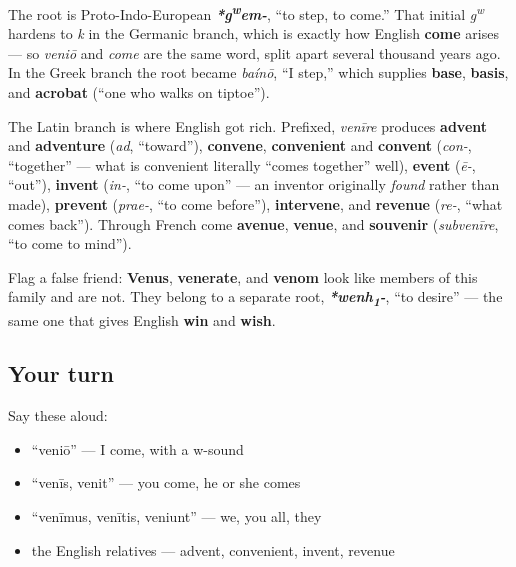 \begin{cousinweb}
The root is Proto-Indo-European \emph{\textbf{*g\textsuperscript{w}em-}}, \textquotedblleft{}to step, to come.\textquotedblright{} That initial \emph{g\textsuperscript{w}} hardens to \emph{k} in the Germanic branch, which is exactly how English \textbf{come} arises — so \emph{veniō} and \emph{come} are the same word, split apart several thousand years ago. In the Greek branch the root became \emph{baínō}, \textquotedblleft{}I step,\textquotedblright{} which supplies \textbf{base}, \textbf{basis}, and \textbf{acrobat} (\textquotedblleft{}one who walks on tiptoe\textquotedblright{}).

The Latin branch is where English got rich. Prefixed, \emph{venīre} produces \textbf{advent} and \textbf{adventure} (\emph{ad}, \textquotedblleft{}toward\textquotedblright{}), \textbf{convene}, \textbf{convenient} and \textbf{convent} (\emph{con-}, \textquotedblleft{}together\textquotedblright{} — what is convenient literally \textquotedblleft{}comes together\textquotedblright{} well), \textbf{event} (\emph{ē-}, \textquotedblleft{}out\textquotedblright{}), \textbf{invent} (\emph{in-}, \textquotedblleft{}to come upon\textquotedblright{} — an inventor originally \emph{found} rather than made), \textbf{prevent} (\emph{prae-}, \textquotedblleft{}to come before\textquotedblright{}), \textbf{intervene}, and \textbf{revenue} (\emph{re-}, \textquotedblleft{}what comes back\textquotedblright{}). Through French come \textbf{avenue}, \textbf{venue}, and \textbf{souvenir} (\emph{subvenīre}, \textquotedblleft{}to come to mind\textquotedblright{}).

Flag a false friend: \textbf{Venus}, \textbf{venerate}, and \textbf{venom} look like members of this family and are not. They belong to a separate root, \emph{\textbf{*wenh\textsubscript{1}-}}, \textquotedblleft{}to desire\textquotedblright{} — the same one that gives English \textbf{win} and \textbf{wish}.
\end{cousinweb}

\subsection*{Your turn}
Say these aloud:

\begin{itemize}
\raggedright
  \item \textquotedblleft{}veniō\textquotedblright{} — I come, with a w-sound
  \item \textquotedblleft{}venīs, venit\textquotedblright{} — you come, he or she comes
  \item \textquotedblleft{}venīmus, venītis, veniunt\textquotedblright{} — we, you all, they
  \item the English relatives — advent, convenient, invent, revenue
\end{itemize}


